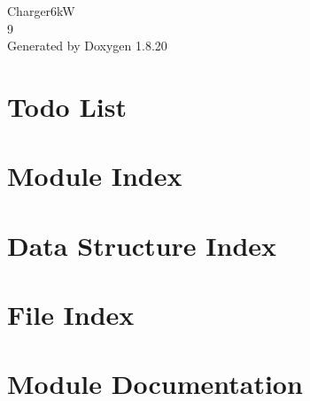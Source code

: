 \let\mypdfximage\pdfximage\def\pdfximage{\immediate\mypdfximage}\documentclass[twoside]{book}
\newcommand{\+}{\discretionary{\mbox{\scriptsize$\hookleftarrow$}}{}{}}
\newcommand{\clearemptydoublepage}{%
  \newpage{\pagestyle{empty}\cleardoublepage}%
}
\begin{document}
\hypersetup{pageanchor=false,
             bookmarksnumbered=true,
             pdfencoding=unicode
            }
\begin{titlepage}
\vspace*{7cm}
\begin{center}%
{\Large Charger6kW \\[1ex]\large 9 }\\
\vspace*{1cm}
{\large Generated by Doxygen 1.8.20}\\
\end{center}
\end{titlepage}
\clearemptydoublepage
{}
\tableofcontents
\clearemptydoublepage
{}
\hypersetup{pageanchor=true}

\chapter{Todo List}
\label{todo}

\chapter{Module Index}

\chapter{Data Structure Index}

\chapter{File Index}

\chapter{Module Documentation}


\end{document}
